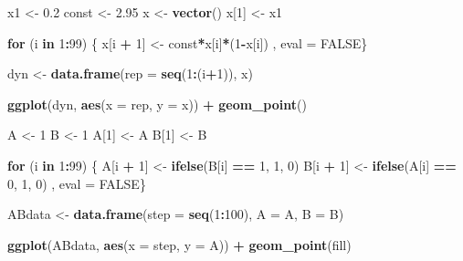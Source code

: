 \documentclass[]{article}
\newenvironment{Shaded}{\begin{snugshade}}{\end{snugshade}}
\newcommand{\KeywordTok}[1]{\textcolor[rgb]{0.13,0.29,0.53}{\textbf{#1}}}
\newcommand{\DataTypeTok}[1]{\textcolor[rgb]{0.13,0.29,0.53}{#1}}
\newcommand{\DecValTok}[1]{\textcolor[rgb]{0.00,0.00,0.81}{#1}}
\newcommand{\FloatTok}[1]{\textcolor[rgb]{0.00,0.00,0.81}{#1}}
\newcommand{\StringTok}[1]{\textcolor[rgb]{0.31,0.60,0.02}{#1}}
\newcommand{\OtherTok}[1]{\textcolor[rgb]{0.56,0.35,0.01}{#1}}
\newcommand{\ControlFlowTok}[1]{\textcolor[rgb]{0.13,0.29,0.53}{\textbf{#1}}}
\newcommand{\OperatorTok}[1]{\textcolor[rgb]{0.81,0.36,0.00}{\textbf{#1}}}
\newcommand{\NormalTok}[1]{#1}
\begin{document}
\begin{Shaded}
\begin{Highlighting}[]
\NormalTok{x1 <-}\StringTok{ }\FloatTok{0.2}
\NormalTok{const <-}\StringTok{ }\FloatTok{2.95}
\NormalTok{x <-}\StringTok{ }\KeywordTok{vector}\NormalTok{()}
\NormalTok{x[}\DecValTok{1}\NormalTok{] <-}\StringTok{ }\NormalTok{x1}

\ControlFlowTok{for}\NormalTok{ (i }\ControlFlowTok{in} \DecValTok{1}\OperatorTok{:}\DecValTok{99}\NormalTok{) \{}
\NormalTok{  x[i }\OperatorTok{+}\StringTok{ }\DecValTok{1}\NormalTok{] <-}\StringTok{ }\NormalTok{const}\OperatorTok{*}\NormalTok{x[i]}\OperatorTok{*}\NormalTok{(}\DecValTok{1}\OperatorTok{-}\NormalTok{x[i])}
\NormalTok{, eval =}\StringTok{ }\OtherTok{FALSE}\NormalTok{\}}

\NormalTok{dyn <-}\StringTok{ }\KeywordTok{data.frame}\NormalTok{(}\DataTypeTok{rep =} \KeywordTok{seq}\NormalTok{(}\DecValTok{1}\OperatorTok{:}\NormalTok{(i}\OperatorTok{+}\DecValTok{1}\NormalTok{)), x)}

\KeywordTok{ggplot}\NormalTok{(dyn, }\KeywordTok{aes}\NormalTok{(}\DataTypeTok{x =}\NormalTok{ rep, }\DataTypeTok{y =}\NormalTok{ x)) }\OperatorTok{+}
\StringTok{  }\KeywordTok{geom_point}\NormalTok{()}


\NormalTok{A <-}\StringTok{ }\DecValTok{1}
\NormalTok{B <-}\StringTok{ }\DecValTok{1}
\NormalTok{A[}\DecValTok{1}\NormalTok{] <-}\StringTok{ }\NormalTok{A}
\NormalTok{B[}\DecValTok{1}\NormalTok{] <-}\StringTok{ }\NormalTok{B}

\ControlFlowTok{for}\NormalTok{ (i }\ControlFlowTok{in} \DecValTok{1}\OperatorTok{:}\DecValTok{99}\NormalTok{) \{}
\NormalTok{  A[i }\OperatorTok{+}\StringTok{ }\DecValTok{1}\NormalTok{] <-}\StringTok{ }\KeywordTok{ifelse}\NormalTok{(B[i] }\OperatorTok{==}\StringTok{ }\DecValTok{1}\NormalTok{, }\DecValTok{1}\NormalTok{, }\DecValTok{0}\NormalTok{)}
\NormalTok{  B[i }\OperatorTok{+}\StringTok{ }\DecValTok{1}\NormalTok{] <-}\StringTok{ }\KeywordTok{ifelse}\NormalTok{(A[i] }\OperatorTok{==}\StringTok{ }\DecValTok{0}\NormalTok{, }\DecValTok{1}\NormalTok{, }\DecValTok{0}\NormalTok{)}
\NormalTok{, eval =}\StringTok{ }\OtherTok{FALSE}\NormalTok{\}}

\NormalTok{ABdata <-}\StringTok{ }\KeywordTok{data.frame}\NormalTok{(}\DataTypeTok{step =} \KeywordTok{seq}\NormalTok{(}\DecValTok{1}\OperatorTok{:}\DecValTok{100}\NormalTok{), }\DataTypeTok{A =}\NormalTok{ A, }\DataTypeTok{B =}\NormalTok{ B)}

\KeywordTok{ggplot}\NormalTok{(ABdata, }\KeywordTok{aes}\NormalTok{(}\DataTypeTok{x =}\NormalTok{ step, }\DataTypeTok{y =}\NormalTok{ A)) }\OperatorTok{+}
\StringTok{  }\KeywordTok{geom_point}\NormalTok{(fill)}


\end{Highlighting}
\end{Shaded}
\end{document}

